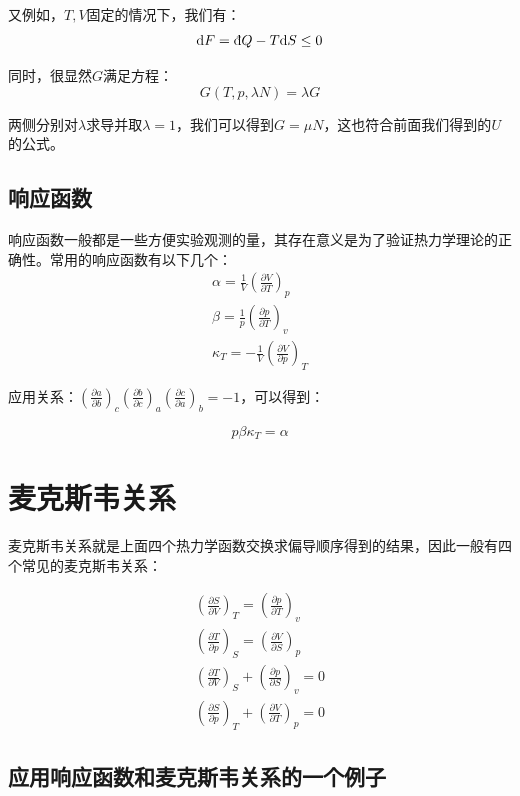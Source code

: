 \documentclass[a4paper, 10pt, openany]{book}%
\begin{document}
又例如，$T,V$固定的情况下，我们有：
\begin{equation}
  \mathrm{d}F=\text{\dj}Q-T\mathrm{d}S\leq0\end{equation}

同时，很显然$G$满足方程：
\begin{equation}
  G(T,p,\lambda N)=\lambda G
\end{equation}

两侧分别对$\lambda$求导并取$\lambda=1$，我们可以得到$G=\mu N$，这也符合前面我们得到的$U$的公式。
\subsection{响应函数}
响应函数一般都是一些方便实验观测的量，其存在意义是为了验证热力学理论的正确性。常用的响应函数有以下几个：
\begin{align}
  \alpha=\frac{1}{V}\left(\frac{\partial V}{\partial T}\right)_p\\
\beta=\frac{1}{p}\left(\frac{\partial p}{\partial T}\right)_v\\
\kappa_T=-\frac{1}{V}\left(\frac{\partial V}{\partial p}\right)_T
\end{align}

应用关系：$\left(\frac{\partial a}{\partial b}\right)_c\left(\frac{\partial b}{\partial c}\right)_a\left(\frac{\partial c}{\partial a}\right)_b=-1$，可以得到：

\begin{equation}
p\beta \kappa_T=\alpha
\end{equation}

\section{麦克斯韦关系}
麦克斯韦关系就是上面四个热力学函数交换求偏导顺序得到的结果，因此一般有四个常见的麦克斯韦关系：

\begin{align}
\left(\frac{\partial S}{\partial V}\right)_T=\left(\frac{\partial p}{\partial T}\right)_v\\
\left(\frac{\partial T}{\partial p}\right)_S=\left(\frac{\partial V}{\partial S}\right)_p\\
\left(\frac{\partial T}{\partial V}\right)_S+\left(\frac{\partial p}{\partial S}\right)_v=0\\
\left(\frac{\partial S}{\partial p}\right)_T+\left(\frac{\partial V}{\partial T}\right)_p=0
\end{align}


\subsection{应用响应函数和麦克斯韦关系的一个例子}
\end{document}
